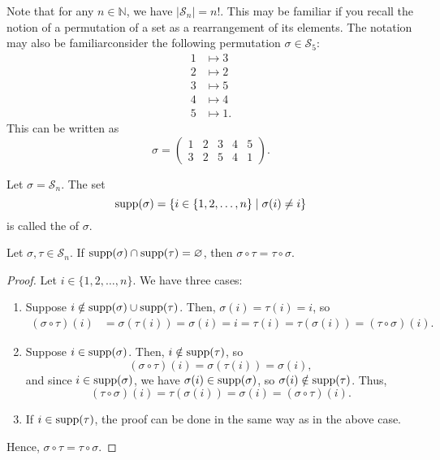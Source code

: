 Note that for any $ n\in\mathbb{N} $, we have $ \lvert\mathcal{S}_n\rvert=n! $. This may be familiar if you recall the notion of a permutation of a set as a rearrangement of its elements. The notation may also be familiar\textemdash consider the following permutation $ \sigma\in\mathcal{S}_5 $:
\begin{align*}
    1 &\mapsto 3 \\
    2 &\mapsto 2 \\
    3 &\mapsto 5 \\
    4 &\mapsto 4 \\
    5 &\mapsto 1.
\end{align*}
This can be written as
\begin{equation*}
    \sigma=
    \begin{pmatrix}
        1 & 2 & 3 & 4 & 5 \\
        3 & 2 & 5 & 4 & 1
    \end{pmatrix}.
\end{equation*}

\begin{defn}
Let $ \sigma=\mathcal{S}_n $. The set
\begin{equation*}
    \operatorname{supp}(\sigma)=\{i\in\{1,2,\ldots,n\}\mid\sigma(i)\neq i\}
\end{equation*}
is called the  of $ \sigma $.
\end{defn}

\begin{prop}
Let $ \sigma,\tau\in\mathcal{S}_n $. If $ \operatorname{supp}(\sigma)\cap\operatorname{supp}(\tau)=\varnothing $, then $ \sigma\circ\tau=\tau\circ\sigma $.
\end{prop}
\begin{proof}
Let $ i\in\{1,2,\ldots,n\} $. We have three cases:
\begin{enumerate}
    \item Suppose $ i\notin\operatorname{supp}(\sigma)\cup\operatorname{supp}(\tau) $. Then, $ \sigma(i)=\tau(i)=i $, so
    \begin{align*}
        (\sigma\circ\tau)(i) &= \sigma(\tau(i))=\sigma(i)=i=\tau(i)=\tau(\sigma(i))=(\tau\circ\sigma)(i).
    \end{align*}

    \item Suppose $ i\in\operatorname{supp}(\sigma) $. Then, $ i\notin\operatorname{supp}(\tau) $, so
    \begin{equation*}
        (\sigma\circ\tau)(i)=\sigma(\tau(i))=\sigma(i),
    \end{equation*}
    and since $ i\in\operatorname{supp}(\sigma) $, we have $ \sigma(i)\in\operatorname{supp}(\sigma) $, so $ \sigma(i)\notin\operatorname{supp}(\tau) $. Thus,
    \begin{equation*}
        (\tau\circ\sigma)(i)=\tau(\sigma(i))=\sigma(i)=(\sigma\circ\tau)(i).
    \end{equation*}

    \item If $ i\in\operatorname{supp}(\tau) $, the proof can be done in the same way as in the above case.
\end{enumerate}
Hence, $ \sigma\circ\tau=\tau\circ\sigma $.
\end{proof}

